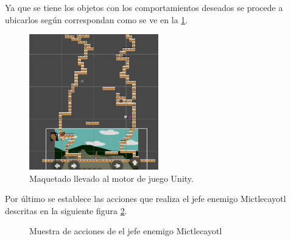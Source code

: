 Ya que se tiene los objetos con los comportamientos deseados se procede a ubicarlos según correspondan como se ve en la \ref{fig:n504}.
\begin{figure}
	\centering
	\caption{Maquetado llevado al motor de juego Unity.}
	\label{fig:n504}
	\includegraphics[width=0.5\textwidth]{03TrabajoRealizado/DocProduccionR/imagenes/n5/n501.png}
\end{figure}

Por último se establece las acciones que realiza el jefe enemigo Mictlecayotl descritas en la siguiente figura \ref{fig:n505}.
\begin{figure}[htbp]
	\centering
	\caption{Muestra de acciones de el jefe enemigo Mictlecayotl} \label{fig:n505}
\end{figure}
